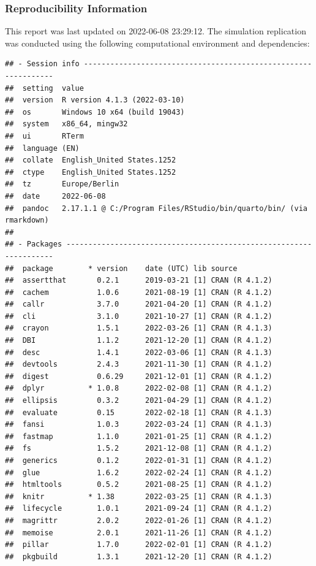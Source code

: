 \documentclass[10,a4paperpaper,]{article}
\begin{document}
\subsubsection*{Reproducibility Information}

This report was last updated on 2022-06-08 23:29:12. The simulation
replication was conducted using the following computational environment
and dependencies:

\FloatBarrier

\begin{verbatim}
## - Session info ---------------------------------------------------------------
##  setting  value
##  version  R version 4.1.3 (2022-03-10)
##  os       Windows 10 x64 (build 19043)
##  system   x86_64, mingw32
##  ui       RTerm
##  language (EN)
##  collate  English_United States.1252
##  ctype    English_United States.1252
##  tz       Europe/Berlin
##  date     2022-06-08
##  pandoc   2.17.1.1 @ C:/Program Files/RStudio/bin/quarto/bin/ (via rmarkdown)
## 
## - Packages -------------------------------------------------------------------
##  package        * version    date (UTC) lib source
##  assertthat       0.2.1      2019-03-21 [1] CRAN (R 4.1.2)
##  cachem           1.0.6      2021-08-19 [1] CRAN (R 4.1.2)
##  callr            3.7.0      2021-04-20 [1] CRAN (R 4.1.2)
##  cli              3.1.0      2021-10-27 [1] CRAN (R 4.1.2)
##  crayon           1.5.1      2022-03-26 [1] CRAN (R 4.1.3)
##  DBI              1.1.2      2021-12-20 [1] CRAN (R 4.1.2)
##  desc             1.4.1      2022-03-06 [1] CRAN (R 4.1.3)
##  devtools         2.4.3      2021-11-30 [1] CRAN (R 4.1.2)
##  digest           0.6.29     2021-12-01 [1] CRAN (R 4.1.2)
##  dplyr          * 1.0.8      2022-02-08 [1] CRAN (R 4.1.2)
##  ellipsis         0.3.2      2021-04-29 [1] CRAN (R 4.1.2)
##  evaluate         0.15       2022-02-18 [1] CRAN (R 4.1.3)
##  fansi            1.0.3      2022-03-24 [1] CRAN (R 4.1.3)
##  fastmap          1.1.0      2021-01-25 [1] CRAN (R 4.1.2)
##  fs               1.5.2      2021-12-08 [1] CRAN (R 4.1.2)
##  generics         0.1.2      2022-01-31 [1] CRAN (R 4.1.2)
##  glue             1.6.2      2022-02-24 [1] CRAN (R 4.1.2)
##  htmltools        0.5.2      2021-08-25 [1] CRAN (R 4.1.2)
##  knitr          * 1.38       2022-03-25 [1] CRAN (R 4.1.3)
##  lifecycle        1.0.1      2021-09-24 [1] CRAN (R 4.1.2)
##  magrittr         2.0.2      2022-01-26 [1] CRAN (R 4.1.2)
##  memoise          2.0.1      2021-11-26 [1] CRAN (R 4.1.2)
##  pillar           1.7.0      2022-02-01 [1] CRAN (R 4.1.2)
##  pkgbuild         1.3.1      2021-12-20 [1] CRAN (R 4.1.2)

\end{verbatim}
\end{document}
